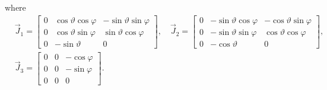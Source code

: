 where
\begin{align*}
	&\vec{J}_1 = \begin{bmatrix}
		0 & \cos\vartheta\cos\varphi & -\sin\vartheta\sin\varphi\\
		0 & \cos\vartheta\sin\varphi & \sin\vartheta\cos\varphi\\
		0 & -\sin\vartheta & 0
	\end{bmatrix},\quad\vec{J}_2 = \begin{bmatrix}
		0 & -\sin\vartheta\cos\varphi & -\cos\vartheta\sin\varphi\\
		0 & -\sin\vartheta\sin\varphi & \cos\vartheta\cos\varphi\\
		0 & -\cos\vartheta & 0
	\end{bmatrix},\\
	&\vec{J}_3 = \begin{bmatrix}
		0 & 0 & -\cos\varphi\\
		0 & 0 & -\sin\varphi\\
		0 & 0 & 0
	\end{bmatrix}.
\end{align*}
